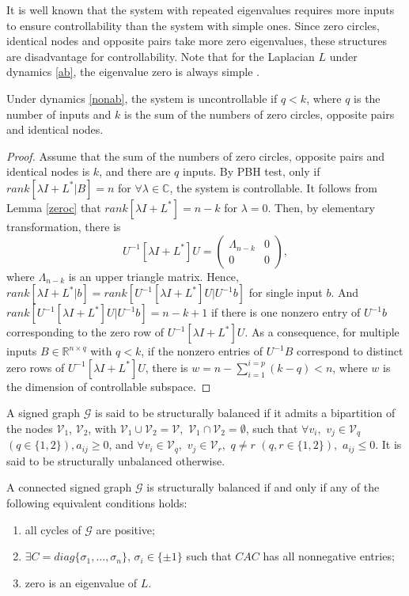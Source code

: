 \documentclass[a4paper,11pt]{article}
\begin{document}
It is well known that the system with repeated eigenvalues requires more inputs to ensure controllability than the system with simple ones. Since zero circles, identical nodes and opposite pairs take more zero eigenvalues, these structures are disadvantage for controllability. Note that for the Laplacian $L$ under dynamics \eqref{ab}, the eigenvalue zero is always simple \cite{biconsensus}.
{\begin{theorem}\label{subspace}
Under dynamics \eqref{nonab}, the system is uncontrollable if $q<k$, where $q$ is the number of inputs and $k$ is the sum of the numbers of zero circles, opposite pairs and identical nodes.
\end{theorem}
\begin{proof}
Assume that the sum of the numbers of zero circles, opposite pairs and identical nodes is $k$, and there are $q$ inputs. By PBH test, only if $rank[\lambda I+L^*|B]=n$ for $\forall \lambda\in\mathbb{C}$, the system is controllable. It follows from Lemma \ref{zeroc} that $rank[\lambda I+L^*]=n-k$ for $\lambda=0$. Then, by elementary transformation, there is \[U^{-1}[\lambda I+L^*]U=\left( {\begin{array}{*{20}{c}}
{{\Lambda_{n - {k}}}}&0\\
0&0
\end{array}} \right),\]
where $\Lambda_{n - {k}}$ is an upper triangle matrix. Hence, $rank[\lambda I+L^*|b]=rank[U^{-1}[\lambda I+L^*]U|U^{-1}b]$ for single input $b$. And $rank[U^{-1}[\lambda I+L^*]U|U^{-1}b]= n-k+1$ if there is one nonzero entry of $U^{-1}b$ corresponding to the zero row of $U^{-1}[\lambda I+L^*]U$. As a consequence, for multiple inputs $B\in\mathbb{R}^{n\times q}$ with $q<k$, if the nonzero entries  of $U^{-1}B$ correspond to distinct zero rows of $U^{-1}[\lambda I+L^*]U$, there is $w= n-\sum_{i=1}^{i=p}(k-q)<n$, where $w$ is the dimension of controllable subspace.
\end{proof}}{
\begin{definition}
A signed graph $\mathcal{G}$ is said to be structurally balanced if it admits a bipartition of the nodes $\mathcal{V}_1$, $\mathcal{V}_2$, with $\mathcal{V}_1\cup\mathcal{V}_2=\mathcal{V},$ $\mathcal{V}_1\cap\mathcal{V}_2=\emptyset$, such that $\forall v_i,$ $v_j\in \mathcal{V}_q$ $(q\in\{1,2\}),a_{ij}\geq 0$, and $\forall v_i\in \mathcal{V}_q,$ $v_j\in\mathcal{V}_r,$ $q\neq r$ $(q,r\in\{1,2\}),$ $a_{ij}\leq 0$. It is said to be structurally unbalanced otherwise.
\end{definition}}
\begin{lemma}\label{sc}
A connected signed graph $\mathcal{G}$ is structurally balanced if and only if any of the following equivalent conditions holds:
\begin{enumerate}[1)]
  \item all cycles of $\mathcal{G}$ are positive;
  \item $\exists C=diag\{\sigma_1,\ldots,\sigma_n\}$, $\sigma_i\in\{\pm 1\}$ such that $CAC$ has all nonnegative entries;
  \item zero is an eigenvalue of $L$.
\end{enumerate}
\end{lemma}
\end{document}

